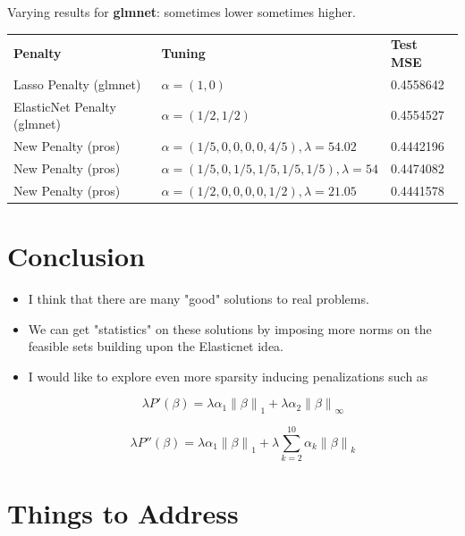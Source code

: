 \documentclass[10pt, reqno]{article}
\numberwithin{equation}{section}
\newcommand{\norm}[1]{\left\lVert#1\right\rVert}
\begin{document}
Varying results for \textbf{glmnet}: sometimes lower sometimes higher.

\begin{center}
\begingroup
\setlength{\tabcolsep}{6pt} %
\renewcommand{\arraystretch}{2} %
\begin{tabular}{ l l l}
\textbf{Penalty} & \textbf{Tuning} & \textbf{Test MSE} \\
Lasso Penalty (glmnet) & $\alpha = (1, 0)$ & 0.4558642 \\
ElasticNet Penalty (glmnet) & $\alpha = (1/2, 1/2)$  & 0.4554527   \\
New Penalty (pros) & $\alpha = (1/5, 0, 0, 0, 0, 4/5), \lambda = 54.02$ & 0.4442196 \\
New Penalty (pros) & $\alpha = (1/5, 0, 1/5, 1/5, 1/5, 1/5), \lambda = 54$ & 0.4474082 \\
New Penalty (pros) & $\alpha = (1/2, 0, 0, 0, 0, 1/2), \lambda = 21.05$ & 0.4441578 \\
\end{tabular}
\endgroup
\end{center}

\newpage
\section*{Conclusion}

\begin{itemize}
\item I think that there are many "good" solutions to real problems.

\item We can get "statistics" on these solutions by imposing more norms on the feasible sets building upon the Elasticnet \cite{elasticnet} idea.

\item I would like to explore even more sparsity inducing penalizations such as

\[
\lambda P'(\beta) = \lambda \alpha_1 \norm{\beta}_1 + \lambda \alpha_2 \norm{\beta}_\infty 
\]

\[
\lambda P''(\beta) = \lambda \alpha_1 \norm{\beta}_1 + \lambda \sum_{k = 2}^{10} \alpha_k \norm{\beta}_{k}
\]

\end{itemize}

\newpage
\section*{Things to Address}
\end{document}
